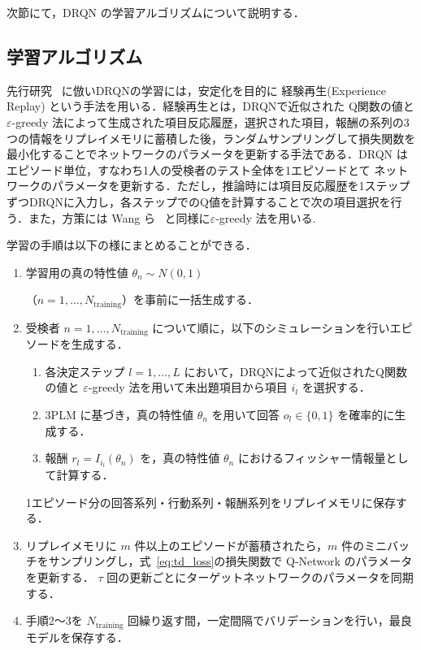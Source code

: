 \documentclass[dvipdfmx,a4j]{jarticle}
\begin{document}
次節にて，DRQN の学習アルゴリズムについて説明する．

\subsection{学習アルゴリズム}

先行研究~\cite{hausknecht2015} に倣いDRQNの学習には，安定化を目的に 経験再生(Experience Replay) という手法を用いる．経験再生とは，DRQNで近似された Q関数の値と $\varepsilon$-greedy 法によって生成された項目反応履歴，選択された項目，報酬の系列の3つの情報をリプレイメモリに蓄積した後，ランダムサンプリングして損失関数を最小化することでネットワークのパラメータを更新する手法である．DRQN はエピソード単位，すなわち1人の受検者のテスト全体を1エピソードとて ネットワークのパラメータを更新する．ただし，推論時には項目反応履歴を1ステップずつDRQNに入力し，各ステップでのQ値を計算することで次の項目選択を行う．また，方策には Wang ら~\cite{wang2024} と同様に$\varepsilon$-greedy 法を用いる.

学習の手順は以下の様にまとめることができる．

\begin{enumerate}
\item 学習用の真の特性値 $\theta_n \sim N(0,1)$

（$n = 1,\ldots,N_{\mathrm{training}}$）を事前に一括生成する．

\item 受検者 $n = 1, \ldots, N_{\mathrm{training}}$ について順に，以下のシミュレーションを行いエピソードを生成する．
  \begin{enumerate}
    \item 各決定ステップ $l = 1, \ldots, L$ において，DRQNによって近似されたQ関数の値と $\varepsilon$-greedy 法を用いて未出題項目から項目 $i_l$ を選択する．
    \item 3PLM に基づき，真の特性値 $\theta_n$ を用いて回答 $o_l \in \{0,1\}$ を確率的に生成する．
    \item 報酬 $r_l = I_{i_l}(\theta_n)$ を，真の特性値 $\theta_n$ におけるフィッシャー情報量として計算する．
  \end{enumerate}
  1エピソード分の回答系列・行動系列・報酬系列をリプレイメモリに保存する．

\item リプレイメモリに $m$ 件以上のエピソードが蓄積されたら，$m$ 件のミニバッチをサンプリングし，式~\eqref{eq:td_loss}の損失関数で Q-Network のパラメータを更新する．
$\tau$ 回の更新ごとにターゲットネットワークのパラメータを同期する．

\item 手順2〜3を $N_{\mathrm{training}}$ 回繰り返す間，一定間隔でバリデーションを行い，最良モデルを保存する．
\end{enumerate}
\end{document}
